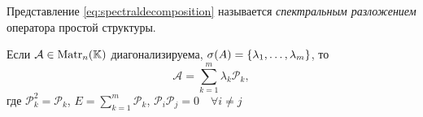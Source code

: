 \begin{definition}
    Представление \eqref{eq:spectraldecomposition} называется \emph{спектральным
    разложением} оператора простой структуры.
\end{definition}

\begin{corollaryth}
    Если $\mathcal{A} \in \mathrm{Matr}_{n}({\mathbb{K}})$ диагонализируема, $\operatorname{\sigma}(A) = \left\{ \lambda_1,
    \dotsc, \lambda_m \right\}$, то 
    \[ \mathcal{A} = \sum_{k=1}^m \lambda_k \mathcal{P}_k, \]
    где $\mathcal{P}_{k}^2 = \mathcal{P}_k$, $ E = \sum\limits_{k=1}^m \mathcal{P}_k $,
    $\mathcal{P}_i \mathcal{P}_j = 0 \quad \forall i \neq j$
\end{corollaryth}
